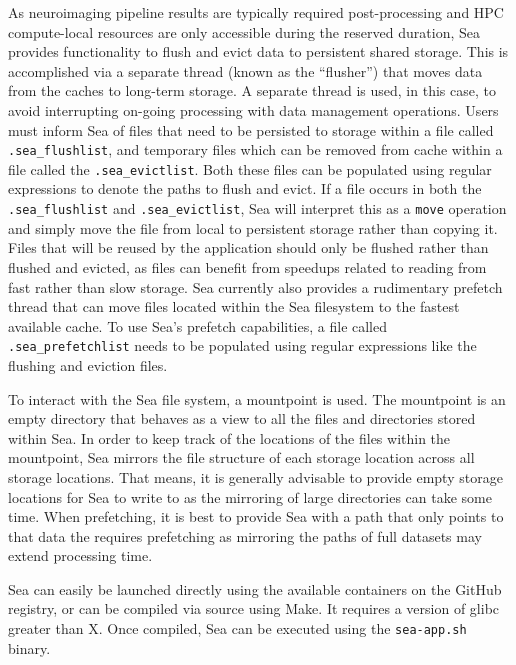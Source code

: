     As neuroimaging pipeline results are typically required post-processing and HPC compute-local resources are only accessible during the
    reserved duration, Sea provides functionality to flush and evict data to persistent shared storage. This is accomplished via a separate
    thread (known as the ``flusher'') that moves data from the caches  to long-term storage. A separate thread is used, in this case, to avoid
    interrupting on-going processing with data management operations.
    Users must inform Sea of files that need to be
    persisted to storage within a file called \texttt{.sea\_flushlist}, and temporary files which can be removed from cache within a file
    called the \texttt{.sea\_evictlist}. Both these files can be populated using regular expressions to denote the paths to flush and evict.
    If a file occurs in both the \texttt{.sea\_flushlist} and \texttt{.sea\_evictlist}, Sea will interpret this as a \texttt{move} operation
    and simply move the file from local to persistent storage rather than copying it. Files that will be reused by the application should only
    be flushed rather than flushed and evicted, as files can benefit from speedups related to reading from fast rather than slow storage.
    Sea currently also provides a rudimentary prefetch thread that can move files located within the Sea filesystem to the fastest available cache.
    To use Sea's prefetch capabilities, a file called \texttt{.sea\_prefetchlist} needs to be populated using regular expressions like the
    flushing and eviction files.
    
    To interact with the Sea file system, a mountpoint is used. The mountpoint is an empty directory that behaves as a view to
    all the files and directories stored within Sea. In order to keep track of the locations of the files within the mountpoint, Sea
    mirrors the file structure of each storage location across all storage locations. That means, it is generally advisable to provide
    empty storage locations for Sea to write to as the mirroring of large directories can take some time. When prefetching, it is
    best to provide Sea with a path that only points to that data the requires prefetching as mirroring the paths of full datasets may 
    extend processing time.
    
    Sea can easily be launched directly using the available containers on the GitHub registry, or can be compiled via source using Make.
    It requires a version of glibc greater than X. Once compiled, Sea can be executed using the \texttt{sea-app.sh} binary.
    
